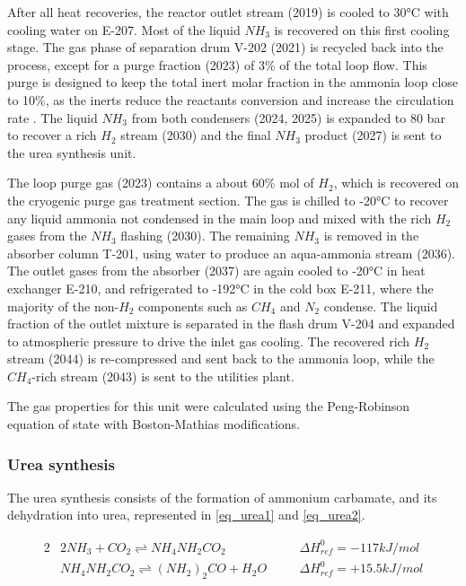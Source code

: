 \documentclass[a4paper, titlepage]{article}
\begin{document}
After all heat recoveries, the reactor outlet stream (2019) is cooled to 30°C with cooling water on E-207. Most of the
liquid $NH_3$ is recovered on this first cooling stage. The gas phase of separation drum V-202 (2021) is recycled back
into the process, except for a purge fraction (2023) of 3\% of the total loop flow. This purge is designed to keep the
total inert molar fraction in the ammonia loop close to 10\%, as the inerts reduce the reactants conversion and
increase the circulation rate \cite{florez-orregoProcessSynthesisOptimization2018}.
The liquid $NH_3$ from both condensers (2024, 2025) is expanded to 80 bar to recover a rich $H_2$ stream (2030) and
the final $NH_3$ product (2027) is sent to the urea synthesis unit.

The loop purge gas (2023) contains a about 60\% mol of $H_2$, which is recovered on the cryogenic purge gas treatment
section. The gas is chilled to -20°C to recover any liquid ammonia not condensed in the main loop and mixed with the
rich $H_2$ gases from the $NH_3$ flashing (2030). The remaining $NH_3$ is removed in the absorber column T-201,
using water to produce an aqua-ammonia stream (2036). The outlet gases from the absorber (2037) are again cooled to
-20°C  in heat exchanger E-210, and refrigerated to -192°C in the cold box E-211, where the majority of the non-$H_2$
components such as $CH_4$ and $N_2$ condense. The liquid fraction of the outlet mixture is separated in the flash drum V-204 and expanded to atmospheric pressure to drive the inlet gas cooling. The recovered rich $H_2$ stream (2044) is re-compressed
and sent back to the ammonia loop, while the $CH_4$-rich stream (2043) is sent to the utilities plant.

The gas properties for this unit were calculated using the Peng-Robinson equation of state with Boston-Mathias
modifications.

\subsubsection{Urea synthesis}
The urea synthesis consists of the formation of ammonium carbamate, and its dehydration into urea, represented in
\autoref{eq_urea1} and \autoref{eq_urea2}.

\begin{alignat}{2}
     & 2NH_3 + CO_2 \rightleftharpoons NH_4NH_2CO_2 \quad      &  & \Delta H_{ref}^0 = -117 kJ/mol \label{eq_urea1}  \\
     & NH_4NH_2CO_2 \rightleftharpoons (NH_2)_2CO + H_2O \quad &  & \Delta H_{ref}^0 = +15.5 kJ/mol \label{eq_urea2}
\end{alignat}
\end{document}

